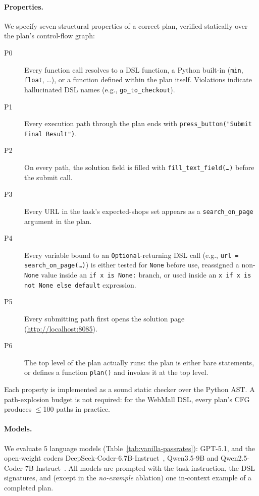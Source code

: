 \paragraph{Properties.}
We specify seven structural properties of a correct plan, verified statically
over the plan's control-flow graph:
\begin{description}
\item[P0] Every function call resolves to a DSL function, a Python built-in
  (\texttt{min}, \texttt{float}, \ldots), or a function defined within the
  plan itself.  Violations indicate hallucinated DSL names
  (e.g., \texttt{go\_to\_checkout}).
\item[P1] Every execution path through the plan ends with
  \texttt{press\_button("Submit Final Result")}.
\item[P2] On every path, the solution field is filled with
  \texttt{fill\_text\_field(\ldots)} before the submit call.
\item[P3] Every URL in the task's expected-shops set appears as a
  \texttt{search\_on\_page} argument in the plan.
\item[P4] Every variable bound to an \texttt{Optional}-returning DSL call
  (e.g., \texttt{url = search\_on\_page(\ldots)}) is either tested for
  \texttt{None} before use, reassigned a non-\texttt{None} value inside an
  \texttt{if x is None:} branch, or used inside an \texttt{x if x is not None
  else default} expression.
\item[P5] Every submitting path first opens the solution page
  (\url{http://localhost:8085}).
\item[P6] The top level of the plan actually runs: the plan is either bare
  statements, or defines a function \texttt{plan()} and invokes it at the top
  level.
\end{description}
Each property is implemented as a sound static checker over the Python AST.
A path-explosion budget is not required: for the WebMall DSL, every plan's
CFG produces $\le$100 paths in practice.

\paragraph{Models.}
We evaluate 5 language models (Table~\ref{tab:vanilla-passrates}): GPT-5.1, and
the open-weight coders DeepSeek-Coder-6.7B-Instruct~\citep{guo2024deepseek},
Qwen3.5-9B and Qwen2.5-Coder-7B-Instruct~\citep{qwencoder2026}.  All models
are prompted with the task instruction, the DSL signatures, and (except in the
\emph{no-example} ablation) one in-context example of a completed plan.

